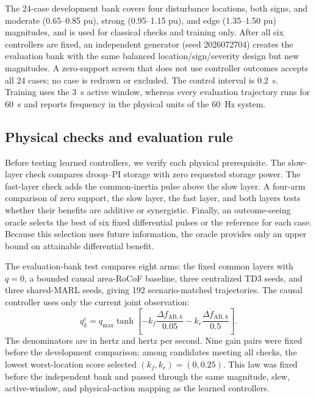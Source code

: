 \documentclass[conference,a4paper]{IEEEtran}
\begin{document}
The 24-case development bank covers four disturbance locations, both signs,
and moderate (0.65--0.85 pu), strong (0.95--1.15 pu), and edge
(1.35--1.50 pu) magnitudes, and is used for classical checks and training
only. After all six controllers are fixed, an independent generator
(seed 2026072704) creates the evaluation bank with the same balanced
location/sign/severity design but new magnitudes. A zero-support screen that
does not use controller outcomes accepts all 24 cases; no case is redrawn or
excluded. The control interval is
\SI{0.2}{s}. Training uses the \SI{3}{s} active window, whereas every
evaluation trajectory runs for \SI{60}{s} and reports frequency in the
physical units of the \SI{60}{Hz} system.

\subsection{Physical checks and evaluation rule}

Before testing learned controllers, we verify each physical prerequisite. The
slow-layer check compares droop--PI storage with zero requested storage power.
The fast-layer check adds the common-inertia pulse above the slow layer. A
four-arm comparison of zero support, the slow layer, the fast layer, and both
layers tests whether their benefits are additive or synergistic. Finally, an
outcome-seeing oracle selects the best of six fixed differential pulses or the
reference for each case. Because this selection uses future information, the
oracle provides only an upper bound on attainable differential benefit.

The evaluation-bank test compares eight arms: the fixed common layers with
\(q=0\), a bounded causal area-RoCoF baseline, three centralized TD3 seeds,
and three shared-MARL seeds, giving 192 scenario-matched trajectories. The
causal controller uses only the current joint observation:
\begin{equation}
 q_k^{\mathrm c}=q_{\max}\tanh\!\left[
 -k_f\frac{\Delta f_{\mathrm{AB},k}}{0.05}
 -k_r\frac{\Delta\dot f_{\mathrm{AB},k}}{0.5}\right].
\label{eq:causal}
\end{equation}
The denominators are in hertz and hertz per second. Nine gain pairs were fixed
before the development comparison; among candidates meeting all checks, the
lowest worst-location score selected \((k_f,k_r)=(0,0.25)\). This law was
fixed before the independent bank and passed through the same magnitude, slew,
active-window, and physical-action mapping as the learned controllers.
\end{document}
